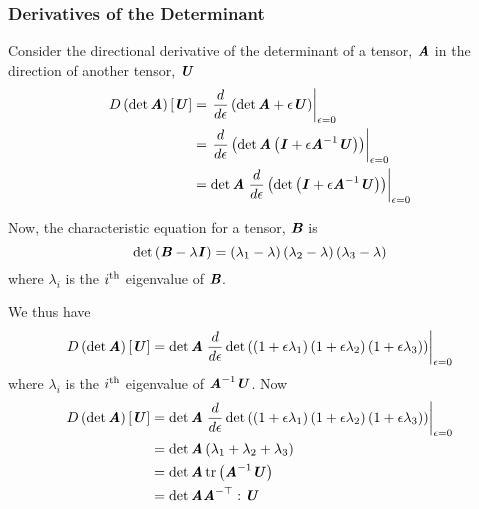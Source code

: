 \subsubsection{Derivatives of the Determinant}
\label{subsubsec:DeterminantDerivativeSecondOrder}

Consider the directional derivative of the determinant of a tensor,
$\boldsymbol{\mathit{A}}$ in the direction of another tensor, $\boldsymbol{\mathit{U}}$
\begin{equation}
  \begin{split}
    \directionalderiv{}{\determinant{\tensor{A}}}{\tensor{U}}
    &=\evalat{\dby{}{\epsilon}\pbrac{\determinant{\tensor{A}+\epsilon\tensor{U}}}}{\epsilon=0}\\
    &=\evalat{\dby{}{\epsilon}\pbrac{\determinant{\tensor{A}\pbrac{\tensor{I}
          +\epsilon\inverse{\tensor{A}}\tensor{U}}}}}{\epsilon=0}\\
    &=\determinant{\tensor{A}}\evalat{\dby{}{\epsilon}\pbrac{\determinant{\pbrac{\tensor{I}
          +\epsilon\inverse{\tensor{A}}\tensor{U}}}}}{\epsilon=0}
  \end{split}
\end{equation}

Now, the characteristic equation for a tensor, $\boldsymbol{\mathit{B}}$ is
\begin{equation}
  \det \left( \boldsymbol{\mathit{B}}-\lambda\boldsymbol{\mathit{I}} \right)
  =\left( \lambda_{1}-\lambda \right)\left( \lambda_{2}-\lambda \right)\left( \lambda_{3}-\lambda \right)
\end{equation}
where $\lambda_{i}$ is the ${i}^{\text{th}}$ eigenvalue of $\boldsymbol{\mathit{B}}$.

We thus have
\begin{equation}
  \directionalderiv{}{\determinant{\tensor{A}}}{\tensor{U}}
  =\determinant{\tensor{A}}\evalat{\dby{}{\epsilon}\determinant{\pbrac{\pbrac{1+\epsilon\lambda_{1}}\pbrac{1+\epsilon\lambda_{2}}\pbrac{1+\epsilon\lambda_{3}}}}}{\epsilon=0}
\end{equation}
where $\lambda_{i}$ is the ${i}^{\text{th}}$ eigenvalue of
${\boldsymbol{\mathit{A}}}^{-1}\boldsymbol{\mathit{U}}$. Now
\begin{equation}
  \begin{split}
    \directionalderiv{}{\determinant{\tensor{A}}}{\tensor{U}}
    &=\determinant{\tensor{A}}\evalat{\dby{}{\epsilon}\determinant{\pbrac{\pbrac{1+\epsilon\lambda_{1}}\pbrac{1+\epsilon\lambda_{2}}\pbrac{1+\epsilon\lambda_{3}}}}}{\epsilon=0}\\
    &=\determinant{\tensor{A}}\pbrac{\lambda_{1}+\lambda_{2}+\lambda_{3}}\\
    &=\determinant{\tensor{A}}\trace{}{\pbrac{\inverse{\tensor{A}}\tensor{U}}}\\
    &=\determinant{\tensor{A}}\doubledotprod{\invtranspose{\tensor{A}}}{\tensor{U}}
  \end{split}
\end{equation}

